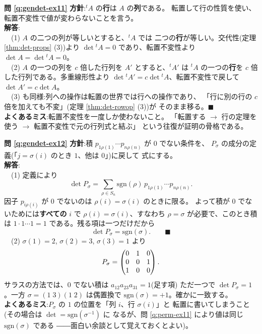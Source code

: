 \bigskip
\noindent\textbf{問 \ref{q:gendet-ex11}}\quad
\textbf{方針}:${}^t\!A$ の\textbf{行}は $A$ の\textbf{列}である。
転置して行の性質を使い、転置不変性で値が変わらないことを言う。\\
\textbf{解答}:\\
　(1) $A$ の二つの列が等しいとすると、${}^t\!A$ では
二つの\textbf{行}が等しい。交代性(定理 \ref{thm:det-props} (3))より
$\det {}^t\!A = 0$ であり、転置不変性より $\det A = \det {}^t\!A = 0$。\\
　(2) $A$ の一つの列を $c$ 倍した行列を $A'$ とすると、${}^t\!A'$ は
${}^t\!A$ の一つの\textbf{行}を $c$ 倍した行列である。多重線形性より
$\det {}^t\!A' = c \det {}^t\!A$、転置不変性で戻して
$\det A' = c \det A$。\\
　(3) も同様:列への操作は転置の世界では行への操作であり、
「行に別の行の $c$ 倍を加えても不変」(定理 \ref{thm:det-rowop} (3))が
そのまま移る。$\blacksquare$\\
\textbf{よくあるミス}:転置不変性を一度しか使わないこと。
「転置する $\to$ 行の定理を使う $\to$ 転置不変性で元の行列式と結ぶ」
という往復が証明の骨格である。

\bigskip
\noindent\textbf{問 \ref{q:gendet-ex12}}\quad
\textbf{方針}:積 $p_{1\rho(1)} \cdots p_{n\rho(n)}$ が $0$ でない条件を、
$P_\sigma$ の成分の定義(「$j = \sigma(i)$ のとき $1$、他は $0$」)に戻して
式にする。\\
\textbf{解答}:\\
　(1) 定義により
\[
\det P_\sigma = \sum_{\rho \in S_n} \mathrm{sgn}(\rho)\,
p_{1\rho(1)} \cdots p_{n\rho(n)}.
\]
因子 $p_{i\rho(i)}$ が $0$ でないのは $\rho(i) = \sigma(i)$ のときに限る。
よって積が $0$ でないためには\textbf{すべての} $i$ で
$\rho(i) = \sigma(i)$、すなわち $\rho = \sigma$ が必要で、このとき積は
$1 \cdot 1 \cdots 1 = 1$ である。残る項は一つだけだから
\[
\det P_\sigma = \mathrm{sgn}(\sigma). \qquad\blacksquare
\]
　(2) $\sigma(1) = 2$, $\sigma(2) = 3$, $\sigma(3) = 1$ より
\[
P_\sigma = \begin{pmatrix}0 & 1 & 0 \\ 0 & 0 & 1 \\ 1 & 0 & 0\end{pmatrix}.
\]
サラスの方法では、$0$ でない積は $a_{12}a_{23}a_{31} = 1$(足す項)
ただ一つで $\det P_\sigma = 1$。一方 $\sigma = (1\;3)(1\;2)$ は偶置換で
$\mathrm{sgn}(\sigma) = +1$。確かに一致する。\\
\textbf{よくあるミス}:$P_\sigma$ の $1$ の位置を「列 $i$、行 $\sigma(i)$」と
転置に書いてしまうこと(その場合は $\det = \mathrm{sgn}(\sigma^{-1})$ に
なるが、問 \ref{q:perm-ex11} により値は同じ $\mathrm{sgn}(\sigma)$ である
――面白い余談として覚えておくとよい)。

